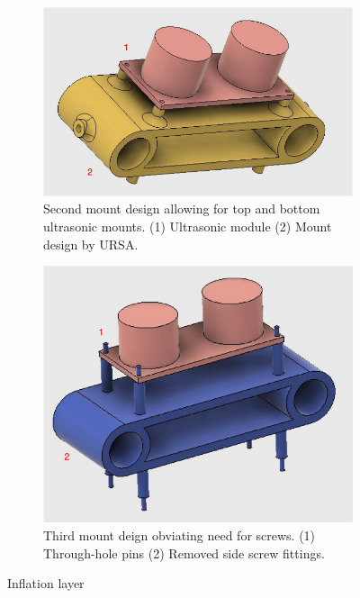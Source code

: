 \documentclass[capstone_report.tex]{subfiles}
\begin{document}
\begin{figure}[H]
    \centering
    \begin{subfigure}[b]{0.45\textwidth}
        \centering
        \includegraphics[width=\textwidth]{./imgs/mount2_labelled.png}
        \caption{Second mount design allowing for top and bottom ultrasonic mounts. (1) Ultrasonic module (2) Mount design by URSA.}
        \label{fig:mount2}
    \end{subfigure}%
    \hfill
    \begin{subfigure}[b]{0.45\textwidth}
        \centering
        \includegraphics[width=\textwidth]{./imgs/mount3_labelled.png}
        \caption{Third mount deign obviating need for screws. (1) Through-hole pins (2) Removed side screw fittings. \label{fig:mount3}}
    \end{subfigure}
    \caption{Inflation layer\label{fig:inflation_layer}}
\end{figure}
\end{document}
